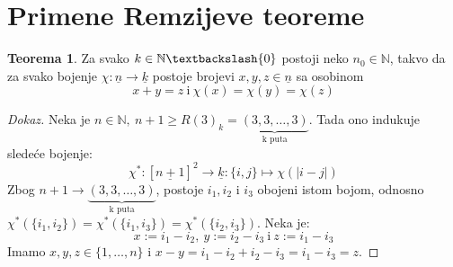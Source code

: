 \documentclass{article}
\theoremstyle{definition}
\newtheorem{teorema}{Teorema}[section]
\newcommand{\dokaz}[1]{\begin{proof}[Dokaz]#1\end{proof}}
\begin{document}
		\section{Primene Remzijeve teoreme}
		\begin{teorema}\label{sur}
			Za svako $k \in \mathbb{N}\textbackslash \{0\}$  postoji neko $n_{0} \in \mathbb{N}$, takvo da za svako bojenje $\chi:\underline{n} \rightarrow \underline{k}$ postoje brojevi $x, y, z \in \underline{n}$ sa osobinom 
			\[
			x + y = z \: \mathrm{i} \: \chi(x)= \chi(y)=\chi(z)
			\]
		\end{teorema}
		\dokaz{
			Neka je $n \in \mathbb{N},\: n+1 \geq R(3)_k=\underbrace{(3,3,\ldots,3)}_\text{k puta}$. Tada ono indukuje sledeće bojenje:
			\[
				\chi^*:[\underline{n+1}]^2\rightarrow \underline{k}:\{i,j\}\mapsto \chi(|i-j|)
			\]
			Zbog $n+1 \rightarrow \underbrace{(3,3,\ldots,3)}_\text{k puta}$, postoje $i_1, i_2$ i $i_3$ obojeni istom bojom, odnosno $\chi^*(\{i_1,i_2\})=\chi^*(\{i_1,i_3\})=\chi^*(\{i_2,i_3\})$. Neka je:
			\[
				x:=i_1-i_2,\:y:=i_2-i_3\:\mathrm{i}\:z:=i_1-i_3
			\]
			Imamo $x,y,z\in \{1,\ldots,n\}$ i $x-y=i_1-i_2+i_2-i_3=i_1-i_3=z$.
		}
\end{document}
